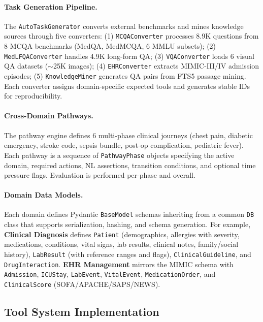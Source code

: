 \documentclass{article}
\begin{document}
\paragraph{Task Generation Pipeline.}
The \texttt{AutoTaskGenerator} converts external benchmarks and mines knowledge sources through five converters: (1) \texttt{MCQAConverter} processes 8.9K questions from 8 MCQA benchmarks (MedQA, MedMCQA, 6 MMLU subsets); (2) \texttt{MedLFQAConverter} handles 4.9K long-form QA; (3) \texttt{VQAConverter} loads 6 visual QA datasets ($\sim$25K images); (4) \texttt{EHRConverter} extracts MIMIC-III/IV admission episodes; (5) \texttt{KnowledgeMiner} generates QA pairs from FTS5 passage mining. Each converter assigns domain-specific expected tools and generates stable IDs for reproducibility.

\paragraph{Cross-Domain Pathways.}
The pathway engine defines 6 multi-phase clinical journeys (chest pain, diabetic emergency, stroke code, sepsis bundle, post-op complication, pediatric fever). Each pathway is a sequence of \texttt{PathwayPhase} objects specifying the active domain, required actions, NL assertions, transition conditions, and optional time pressure flags. Evaluation is performed per-phase and overall.

\paragraph{Domain Data Models.}
Each domain defines Pydantic \texttt{BaseModel} schemas inheriting from a common \texttt{DB} class that supports serialization, hashing, and schema generation. For example, \textbf{Clinical Diagnosis} defines \texttt{Patient} (demographics, allergies with severity, medications, conditions, vital signs, lab results, clinical notes, family/social history), \texttt{LabResult} (with reference ranges and flags), \texttt{ClinicalGuideline}, and \texttt{DrugInteraction}. \textbf{EHR Management} mirrors the MIMIC schema with \texttt{Admission}, \texttt{ICUStay}, \texttt{LabEvent}, \texttt{VitalEvent}, \texttt{MedicationOrder}, and \texttt{ClinicalScore} (SOFA/APACHE/SAPS/NEWS).

\subsection{Tool System Implementation}
\end{document}
